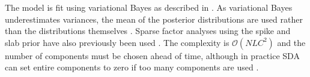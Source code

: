 The model is fit using variational Bayes as described in \parencite{Hore2015Latent, Hore2016Tensor}. As variational Bayes underestimates variances, the mean of the posterior distributions are used rather than the distributions themselves \parencite{Jaakkola2000Bayesian}. Sparse factor analyses using the spike and slab prior have also previously been used \parencite{West2003Bayesian, Lucas2006Sparse}. The complexity is $\mathcal{O}(NLC^2)$ and the number of components must be chosen ahead of time, although in practice SDA can set entire components to zero if too many components are used \parencite{Hore2015Latent, Hore2016Tensor}.






